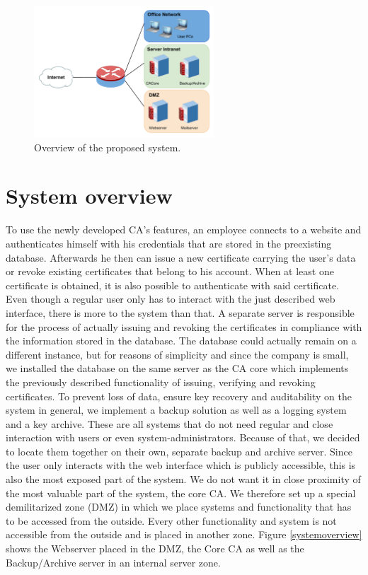 \documentclass[a4paper, toc=index, 12pt, DIV14, twoside, BCOR2cm, headsepline, numbers=noenddot, bibliography=totoc]{report}
\begin{document}
\begin{figure}[H]
  \centering
    \includegraphics[width=0.6\textwidth]{images/new_overview.pdf}  
  \caption{Overview of the proposed system.}
  \label{newoverview}
\end{figure}

\section{System overview}
To use the newly developed CA's features, an employee connects to a website and authenticates himself with his credentials that are stored in the preexisting database. Afterwards he then can issue a new certificate carrying the user's data or revoke existing certificates that belong to his account. When at least one certificate is obtained, it is also possible to authenticate with said certificate. Even though a regular user only has to interact with the just described web interface, there is more to the system than that. A separate server is responsible for the process of actually issuing and revoking the certificates in compliance with the information stored in the database. The database could actually remain on a different instance, but for reasons of simplicity and since the company is small, we installed the database on the same server as the CA core which implements the previously described functionality of issuing, verifying and revoking certificates. To prevent loss of data, ensure key recovery and auditability on the system in general, we implement a backup solution as well as a logging system and a key archive. These are all systems that do not need regular and close interaction with users or even system-administrators. Because of that, we decided to locate them together on their own, separate backup and archive server.\newline
Since the user only interacts with the web interface which is publicly accessible, this is also the most exposed part of the system. We do not want it in close proximity of the most valuable part of the system, the core CA. We therefore set up a special demilitarized zone (DMZ) in which we place systems and functionality that has to be accessed from the outside. Every other functionality and system is not accessible from the outside and is placed in another zone.\newline
Figure \ref{systemoverview} shows the Webserver placed in the DMZ, the Core CA as well as the Backup/Archive server in an internal server zone.
\end{document}
